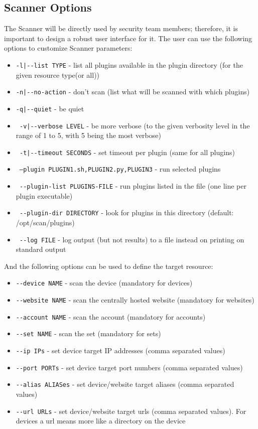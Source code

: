 \subsection{Scanner Options}
The Scanner will be directly used by security team members; therefore, it is important to design a robust user interface for it. The user can use the following options to customize Scanner parameters:

\begin{itemize}

\item 

    \texttt{-l|-{}-list TYPE} - list all plugins available in the plugin directory 
                       (for the given resource type(or all))
\item                  
    \texttt{-n|-{}-no-action} - don't scan    			     (list what will be scanned with which plugins)
\item    \texttt{-q|-{}-quiet} - be quiet
\item    \texttt{    -v|-{}-verbose LEVEL} - be more verbose 
    	 				 (to the given verbosity level in the range of 1 to 5,
    	 				  with 5 being the most verbose)
\item    \texttt{    -t|-{}-timeout SECONDS} - set timeout per plugin (same for all plugins)
\item    \texttt{    --plugin PLUGIN1.sh,PLUGIN2.py,PLUGIN3} - run selected plugins
\item    \texttt{ -{}-plugin-list PLUGINS-FILE} - run plugins listed in the file (one line per plugin executable)
\item    \texttt{  -{}-plugin-dir DIRECTORY} - look for plugins in this directory (default: /opt/scan/plugins)
\item    \texttt{    -{}-log FILE} - log output (but not results) to a file instead on printing on standard output  

\end{itemize}
And the following options can be used to define the target resource:
\begin{itemize}

    \item    \texttt{-{}-device NAME} - scan the device (mandatory for devices)
    \item    \texttt{-{}-website NAME} - scan the centrally hosted website (mandatory for websites)
    \item    \texttt{-{}-account NAME} - scan the account (mandatory for accounts)
    \item    \texttt{-{}-set NAME} - scan the set (mandatory for sets)
    \item    \texttt{-{}-ip IPs} - set device target IP addresses (comma separated values)
    \item    \texttt{-{}-port PORTs} - set device target port numbers (comma separated values)
    \item    \texttt{-{}-alias ALIASes} - set device/website target aliases (comma separated values)
    \item    \texttt{-{}-url URLs} - set device/website target urls (comma separated values). For devices a url means more like a directory on the device 
   \end{itemize}
   

